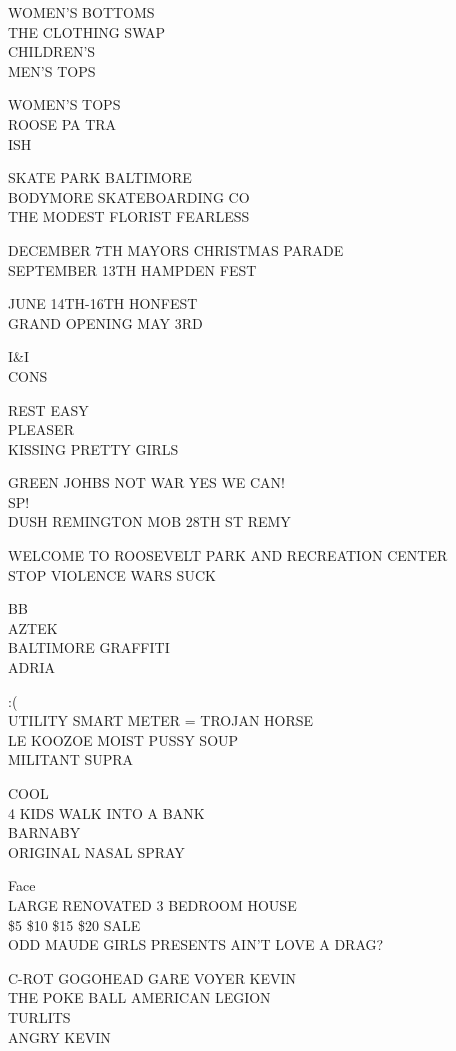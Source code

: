 \documentclass[10pt,letterpaper]{article}
\begin{document}
WOMEN'S BOTTOMS\\
THE CLOTHING SWAP\\
CHILDREN'S\\
MEN'S TOPS

WOMEN'S TOPS\\
ROOSE PA TRA\\
ISH

SKATE PARK BALTIMORE\\
BODYMORE SKATEBOARDING CO\\
THE MODEST FLORIST FEARLESS

DECEMBER 7TH MAYORS CHRISTMAS PARADE\\
SEPTEMBER 13TH HAMPDEN FEST

JUNE 14TH{-}16TH HONFEST\\
GRAND OPENING MAY 3RD

I\&I\\
CONS

REST EASY\\
PLEASER\\
KISSING PRETTY GIRLS

GREEN JOHBS NOT WAR YES WE CAN!\\
SP!\\
DUSH REMINGTON MOB 28TH ST REMY

WELCOME TO ROOSEVELT PARK AND RECREATION CENTER\\
STOP VIOLENCE WARS SUCK

BB\\
AZTEK\\
BALTIMORE GRAFFITI\\
ADRIA

:(\\
UTILITY SMART METER = TROJAN HORSE\\
LE KOOZOE MOIST PUSSY SOUP\\
MILITANT SUPRA

COOL\\
4 KIDS WALK INTO A BANK\\
BARNABY\\
ORIGINAL NASAL SPRAY

Face\\
LARGE RENOVATED 3 BEDROOM HOUSE\\
\$5 \$10 \$15 \$20 SALE\\
ODD MAUDE GIRLS PRESENTS AIN'T LOVE A DRAG?

C{-}ROT GOGOHEAD GARE VOYER KEVIN\\
THE POKE BALL AMERICAN LEGION\\
TURLITS\\
ANGRY KEVIN
\end{document}
